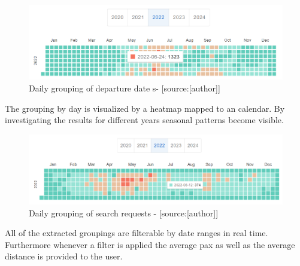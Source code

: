 \begin{figure}[H]
	\centering
		\includegraphics[width=15cm]{images/grouping_by_taskFrom}
	\caption{Daily grouping of departure date s- [source:[author]]}
	\label{fig:grouping_dep_daily}
\end{figure}
The grouping by day is visualized by a heatmap mapped to an calendar. By investigating the results for different years seasonal patterns become visible.
\begin{figure}[H]
	\centering
		\includegraphics[width=15cm]{images/daily_grouping_search_requets}
	\caption{Daily grouping of search requests - [source:[author]]}
	\label{fig:grouping_search_daily}
\end{figure}
All of the extracted groupings are filterable by date ranges in real time. Furthermore whenever a filter is applied the average pax as well as the average distance is provided to the user.